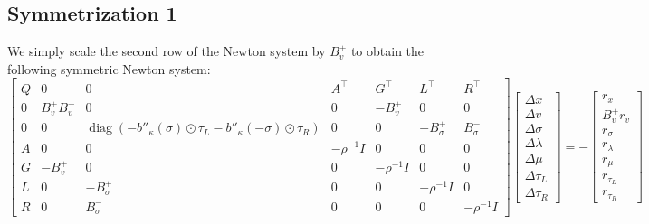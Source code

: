\documentclass[11pt]{article}
\theoremstyle{plain}
\theoremstyle{definition}
\theoremstyle{remark}
\newcommand{\diag}{\operatorname{diag}}
\begin{document}
\subsection{Symmetrization 1}
We simply scale the second row of the Newton system by $B_v^+$ to obtain the following symmetric Newton system:
\begin{equation}
\begin{bmatrix}
    Q & 0 & 0 & A^\top & G^\top & L^\top & R^\top \\
    0 & B_v^+ B_v^- & 0 & 0 & -B_v^+ & 0 & 0 \\
    0 & 0 & \diag{(-b''_\kappa(\sigma) \odot \tau_L - b''_\kappa(-\sigma) \odot \tau_R)} & 0 & 0 & -B_\sigma^+ & B_\sigma^- \\
    A & 0 & 0 & -\rho^{-1} I & 0 & 0 & 0 \\
    G & -B_v^+ & 0 & 0 & -\rho^{-1} I & 0 & 0 \\
    L & 0 & -B_\sigma^+ & 0 & 0 & -\rho^{-1} I & 0 \\
    R & 0 & B_\sigma^- & 0 & 0 & 0 & -\rho^{-1} I
\end{bmatrix}
\begin{bmatrix}
    \Delta x \\ \Delta v \\ \Delta \sigma \\ \Delta \lambda \\ \Delta \mu \\ \Delta \tau_L \\ \Delta \tau_R
\end{bmatrix}
=
-\begin{bmatrix}
    r_x \\ B_v^+ r_v \\ r_\sigma \\ r_\lambda \\ r_\mu \\ r_{\tau_L} \\ r_{\tau_R}
\end{bmatrix}
\end{equation}
\end{document}

